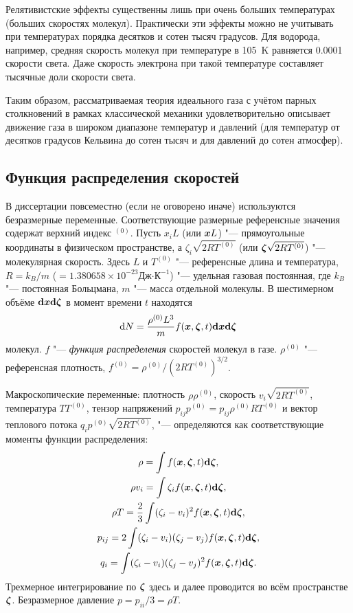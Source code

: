 Релятивистские эффекты существенны лишь при очень больших температурах (больших скоростях молекул).
Практически эти эффекты можно не учитывать при температурах порядка десятков и сотен тысяч градусов.
Для водорода, например, средняя скорость молекул при температуре в 105~K равняется 0.0001 скорости света.
Даже скорость электрона при такой температуре составляет тысячные доли скорости света.

Таким образом, рассматриваемая теория идеального газа с учётом парных столкновений в рамках классической механики
удовлетворительно описывает движение газа в широком диапазоне температур и давлений
(для температур от десятков градусов Кельвина до сотен тысяч и для давлений до сотен атмосфер).


\subsection{Функция распределения скоростей}

В диссертации повсеместно (если не оговорено иначе) используются безразмерные переменные.
Соответствующие размерные референсные значения содержат верхний индекс \({}^{(0)}\).
Пусть \(x_iL\) (или \({\boldsymbol{x}} L\)) "--- прямоугольные координаты в физическом пространстве,
а \(\zeta_i\sqrt{2RT^{(0)}}\) (или \({\boldsymbol{\zeta}}\sqrt{2RT^{(0)}}\)) "--- молекулярная скорость.
Здесь \(L\) и \(T^{(0)}\) "--- референсные длина и температура,
\(R = k_B/m\) (\(=1.380658\times 10^{-23} \text{Дж·К}^{-1}\))
"--- удельная газовая постоянная, где \(k_B\) "--- постоянная Больцмана,
\(m\) "--- масса отдельной молекулы.
В шестимерном объёме \(\boldsymbol{\mathrm{d}{x}}\boldsymbol{\mathrm{d}\zeta}\) в момент времени \(t\) находятся
\begin{equation}\label{eq:distrib_function}
    \mathrm{d}{N} = \frac{\rho^{(0)}L^3}{m} f({\boldsymbol{x}},{\boldsymbol{\zeta}},t)\boldsymbol{\mathrm{d}{x}}\boldsymbol{\mathrm{d}\zeta}
\end{equation}
молекул. \(f\) "--- \emph{функция распределения} скоростей молекул в газе.
\(\rho^{(0)}\) "--- референсная плотность, \(f^{(0)} = \rho^{(0)}/(2RT^{(0)})^{3/2}\).

Макроскопические переменные: плотность \(\rho\rho^{(0)}\), скорость \(v_i\sqrt{2RT^{(0)}}\),
температура \(TT^{(0)}\), тензор напряжений \(p_{ij}p^{(0)} = p_{ij}\rho^{(0)}RT^{(0)}\)
и вектор теплового потока \(q_i p^{(0)}\sqrt{2RT^{(0)}}\), "--- определяются
как соответствующие моменты функции распределения:
\begin{gather}\label{eq:macro_variables}
    \rho = \int f({\boldsymbol{x}},{\boldsymbol{\zeta}},t)\boldsymbol{\mathrm{d}\zeta}, \\
    \rho v_i = \int \zeta_i f({\boldsymbol{x}},{\boldsymbol{\zeta}},t)\boldsymbol{\mathrm{d}\zeta}, \\
    \rho T = \frac23 \int (\zeta_i-v_i)^2 f({\boldsymbol{x}},{\boldsymbol{\zeta}},t)\boldsymbol{\mathrm{d}\zeta}, \\
    p_{ij} = 2\int (\zeta_i-v_i)(\zeta_j-v_j) f({\boldsymbol{x}},{\boldsymbol{\zeta}},t)\boldsymbol{\mathrm{d}\zeta}, \\
    q_i = \int (\zeta_i-v_i)(\zeta_j-v_j)^2 f({\boldsymbol{x}},{\boldsymbol{\zeta}},t)\boldsymbol{\mathrm{d}\zeta}.
\end{gather}
Трехмерное интегрирование по \({\boldsymbol{\zeta}}\) здесь и далее проводится во всём пространстве \({\boldsymbol{\zeta}}\).
Безразмерное давление \(p = p_{ii}/3 = \rho T\).

